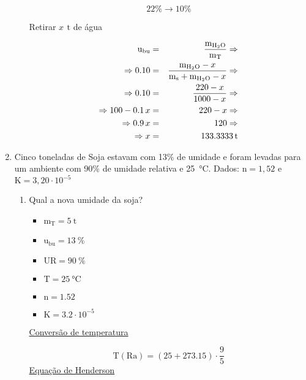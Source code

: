 \documentclass[a4paper, 12pt]{article}
\newcommand{\tmass}{\text{m}_{\text{T}}}
\newcommand{\wmass}{\text{m}_{\ce{H2O}}}
\newcommand{\smass}{\text{m}_{\text{\text{s}}}}
\newcommand{\ubu}{\text{u}_{\text{bu}}}
\newcommand{\ur}{\text{UR}}
\newcommand{\kk}{\text{K}}
\newcommand{\tpt}{\text{T}}
\begin{document}
\begin{enumerate}
\begin{enumerate}
			\begin{equation}
				22\% \rightarrow 10\%
			\end{equation}
			
			Retirar $x\,\SI{}{\tonne}$ de água
			
			\begin{eqnarray}
				\ubu&=&\dfrac{\wmass}{\tmass}\Rightarrow\\
				\Rightarrow 0.10&=&\dfrac{\wmass-x}{\smass+\wmass-x}\Rightarrow\\
				\Rightarrow 0.10&=&\dfrac{220-x}{1000-x}\Rightarrow\\
				\Rightarrow 100-0.1\,x&=&220-x\Rightarrow\\
				\Rightarrow 0.9\,x&=&120\Rightarrow\\
				\Rightarrow x&=&\SI{133.3333}{\tonne}	
			\end{eqnarray}
		\end{enumerate}
		
		\item Cinco toneladas de Soja estavam com 13\% de umidade e foram levadas para um ambiente com 90\% de umidade relativa e \SI{25}{\celsius}. Dados: $\text{n}=1,52$ e $\text{K}=3,20\cdot 10^{-5}$
		
		\begin{enumerate}
			
			\item Qual a nova umidade da soja?\\
			
			\begin{minipage}{.25\linewidth}
				\begin{itemize}
					\item $\tmass=\SI{5}{\tonne}$
					\item $\ubu=\SI{13}{\percent}$
					\item $\ur=\SI{90}{\percent}$
					\item $\tpt=\SI{25}{\celsius}$
					\item $\text{n}=1.52$
					\item $\kk=3.2\cdot 10^{-5}$
				\end{itemize}
			\end{minipage}
			\begin{minipage}{.75\linewidth}
				
				\underline{Conversão de temperatura}
				
				\begin{equation}
					\tpt(\text{Ra})=(25+273.15)\cdot\frac{9}{5}
				\end{equation}
				\underline{Equação de Henderson}
				

\end{minipage}
\end{enumerate}
\end{enumerate}
\end{document}
